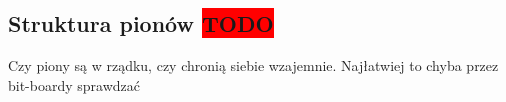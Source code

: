\subsection{Struktura pionów \colorbox{red}{TODO}}
\label{subsec:struktura-pionow}

{
    \color{red}
    \large Czy piony są w rządku, czy chronią siebie wzajemnie.
Najłatwiej to chyba przez bit-boardy sprawdzać
}